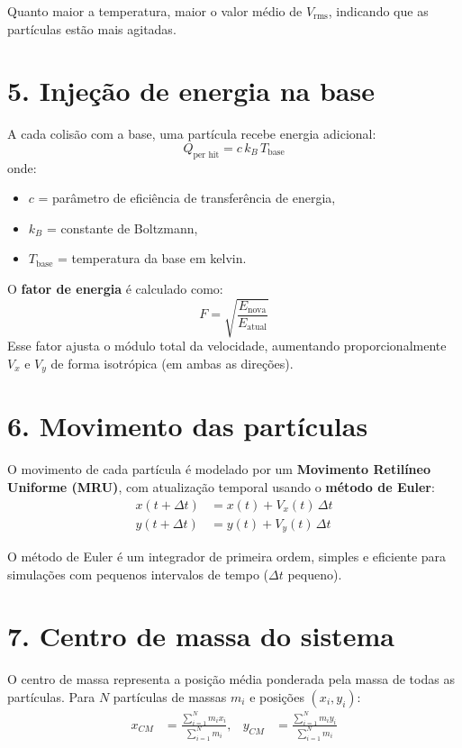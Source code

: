 \documentclass[12pt,a4paper]{article}
\begin{document}
Quanto maior a temperatura, maior o valor médio de $V_{\text{rms}}$, indicando que as partículas estão mais agitadas.

\section*{5. Injeção de energia na base}

A cada colisão com a base, uma partícula recebe energia adicional:
\begin{equation}
    Q_{\text{per hit}} = c \, k_B \, T_{\text{base}}
\end{equation}
onde:
\begin{itemize}
    \item $c$ = parâmetro de eficiência de transferência de energia,
    \item $k_B$ = constante de Boltzmann,
    \item $T_{\text{base}}$ = temperatura da base em kelvin.
\end{itemize}

O \textbf{fator de energia} é calculado como:
\begin{equation}
    F = \sqrt{\frac{E_{\text{nova}}}{E_{\text{atual}}}}
\end{equation}
Esse fator ajusta o módulo total da velocidade, aumentando proporcionalmente $V_x$ e $V_y$ de forma isotrópica (em ambas as direções).

\section*{6. Movimento das partículas}

O movimento de cada partícula é modelado por um \textbf{Movimento Retilíneo Uniforme (MRU)}, com atualização temporal usando o \textbf{método de Euler}:
\begin{align}
    x(t + \Delta t) &= x(t) + V_x(t)\,\Delta t \\
    y(t + \Delta t) &= y(t) + V_y(t)\,\Delta t
\end{align}

O método de Euler é um integrador de primeira ordem, simples e eficiente para simulações com pequenos intervalos de tempo ($\Delta t$ pequeno).

\section*{7. Centro de massa do sistema}

O centro de massa representa a posição média ponderada pela massa de todas as partículas. Para $N$ partículas de massas $m_i$ e posições $(x_i, y_i)$:
\begin{align}
    x_{CM} &= \frac{\sum_{i=1}^{N} m_i x_i}{\sum_{i=1}^{N} m_i}, &
    y_{CM} &= \frac{\sum_{i=1}^{N} m_i y_i}{\sum_{i=1}^{N} m_i}
\end{align}
\end{document}
